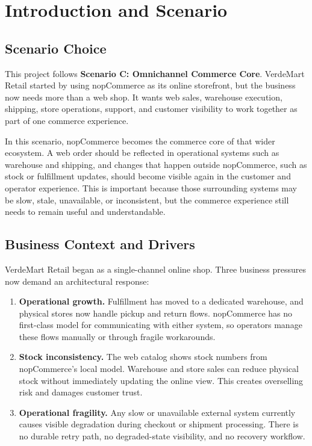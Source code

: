 \chapter{Introduction and Scenario}

\section{Scenario Choice}

This project follows \textbf{Scenario C: Omnichannel Commerce Core}. VerdeMart Retail
started by using nopCommerce as its online storefront, but the business now needs more than a
web shop. It wants web sales, warehouse execution, shipping, store operations, support, and
customer visibility to work together as part of one commerce experience.

In this scenario, nopCommerce becomes the commerce core of that wider ecosystem. A web order
should be reflected in operational systems such as warehouse and shipping, and changes that
happen outside nopCommerce, such as stock or fulfillment updates, should become visible again
in the customer and operator experience. This is important because those surrounding systems
may be slow, stale, unavailable, or inconsistent, but the commerce experience still needs to
remain useful and understandable.

\section{Business Context and Drivers}

VerdeMart Retail began as a single-channel online shop. Three business pressures now demand an
architectural response:

\begin{enumerate}
    \item \textbf{Operational growth.} Fulfillment has moved to a dedicated warehouse, and
    physical stores now handle pickup and return flows. nopCommerce has no first-class model
    for communicating with either system, so operators manage these flows manually or through
    fragile workarounds.

    \item \textbf{Stock inconsistency.} The web catalog shows stock numbers from nopCommerce's
    local model. Warehouse and store sales can reduce physical stock without immediately
    updating the online view. This creates overselling risk and damages customer trust.

    \item \textbf{Operational fragility.} Any slow or unavailable external system currently
    causes visible degradation during checkout or shipment processing. There is no durable
    retry path, no degraded-state visibility, and no recovery workflow.
\end{enumerate}

